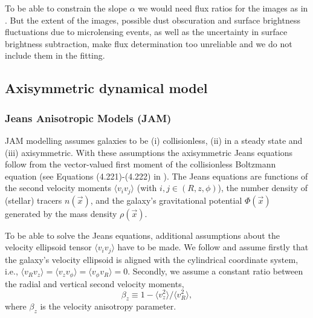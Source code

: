 \documentclass[useAMS,usenatbib]{mnras}
\newcommand{\vect}[1]{\vec{#1}} %
\begin{document}
To be able to constrain the slope $\alpha$ we would need flux ratios for the images as in \citet{GlennEC}. But the extent of the images, possible dust obscuration and surface brightness fluctuations due to microlensing events, as well as the uncertainty in surface brightness subtraction, make flux determination too unreliable and we do not include them in the fitting.

\subsection{Axisymmetric dynamical model} \label{sec:model_JAM}

\subsubsection{Jeans Anisotropic Models (JAM)} \label{sec:model_JAM_JAM}

JAM modelling assumes galaxies to be (i) collisionless, (ii) in a steady state and (iii) axisymmetric. With these assumptions the axisymmetric Jeans equations follow from the vector-valued first moment of the collisionless Boltzmann equation (see Equations (4.221)-(4.222) in \citet{2008gady.book.....B}). The Jeans equations are functions of the second velocity moments $\langle v_i v_j\rangle$ (with $i,j\in(R,z,\phi)$), the number density of (stellar) tracers $n(\vect{x})$, and the galaxy's gravitational potential $\Phi(\vect{x})$ generated by the mass density $\rho(\vect{x})$.

To be able to solve the Jeans equations, additional assumptions about the velocity ellipsoid tensor $\langle v_i v_j\rangle$ have to be made. We follow \citet{Cap08} and assume firstly that the galaxy's velocity ellipsoid is aligned with the cylindrical coordinate system, i.e., $\langle v_R v_z\rangle = \langle v_z v_\phi \rangle = \langle v_\phi v_R \rangle = 0$. Secondly, we assume a constant ratio between the radial and vertical second velocity moments, 
\begin{equation}
\beta_z \equiv 1 - \langle v_z^2 \rangle / \langle v_R^2\rangle, \label{eq:bz}
\end{equation}
where $\beta_z$ is the velocity anisotropy parameter.
\end{document}
